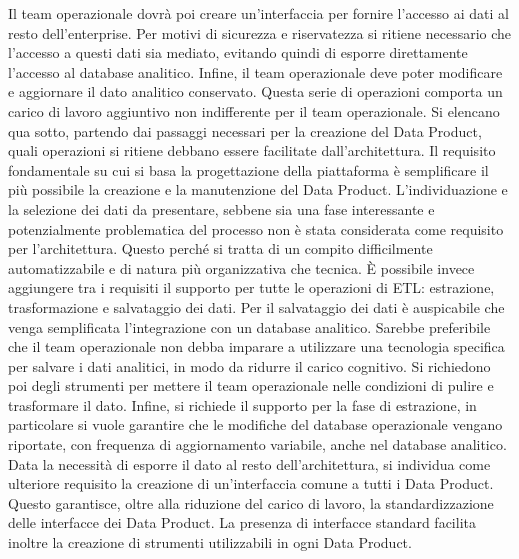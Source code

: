 \documentclass[a4paper,12pt]{report}
\begin{document}
Il team operazionale dovrà poi creare un'interfaccia per fornire l'accesso ai dati al resto dell'enterprise.
Per motivi di sicurezza e riservatezza si ritiene necessario che l'accesso a questi dati sia mediato, evitando quindi di esporre direttamente l'accesso al database analitico.
Infine, il team operazionale deve poter modificare e aggiornare il dato analitico conservato.
Questa serie di operazioni comporta un carico di lavoro aggiuntivo non indifferente per il team operazionale. 
Si elencano qua sotto, partendo dai passaggi necessari per la creazione del Data Product, quali operazioni si ritiene debbano essere facilitate dall'architettura.
Il requisito fondamentale su cui si basa la progettazione della piattaforma è semplificare il più possibile la creazione e la manutenzione del Data Product.
L'individuazione e la selezione dei dati da presentare, sebbene sia una fase interessante e potenzialmente problematica del processo non è stata considerata come requisito per l'architettura. 
Questo perché si tratta di un compito difficilmente automatizzabile e di natura più organizzativa che tecnica.
È possibile invece aggiungere tra i requisiti il supporto per tutte le operazioni di ETL: estrazione, trasformazione e salvataggio dei dati.
Per il salvataggio dei dati è auspicabile che venga semplificata l'integrazione con un database analitico. 
Sarebbe preferibile che il team operazionale non debba imparare a utilizzare una tecnologia specifica per salvare i dati analitici, in modo da ridurre il carico cognitivo.
Si richiedono poi degli strumenti per mettere il team operazionale nelle condizioni di pulire e trasformare il dato.
Infine, si richiede il supporto per la fase di estrazione, in particolare si vuole garantire che le modifiche del database operazionale vengano riportate, con frequenza di aggiornamento variabile, anche nel database analitico.
Data la necessità di esporre il dato al resto dell'architettura, si individua come ulteriore requisito la creazione di un'interfaccia comune a tutti i Data Product.
Questo garantisce, oltre alla riduzione del carico di lavoro, la standardizzazione delle interfacce dei Data Product.
La presenza di interfacce standard facilita inoltre la creazione di strumenti utilizzabili in ogni Data Product.
\end{document}

